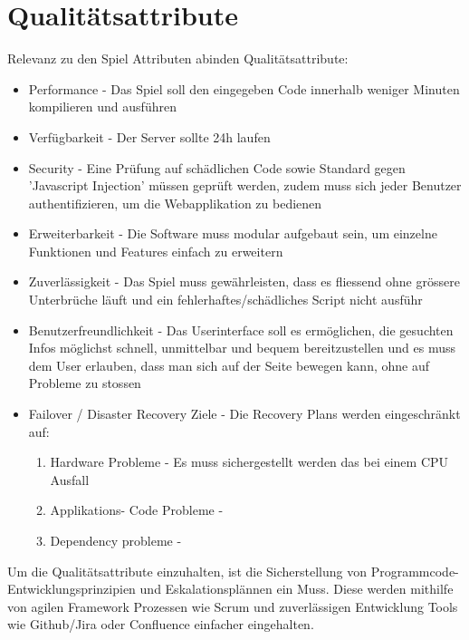 \documentclass[a4paper, 11pt]{scrartcl}
\let\oldsection\section
\renewcommand\section{\clearpage\oldsection}
\begin{document}
\section{Qualitätsattribute}

Relevanz zu den Spiel Attributen abinden
Qualitätsattribute:
\begin{itemize}

\item Performance - Das Spiel soll den eingegeben Code innerhalb weniger Minuten kompilieren und ausführen
\item Verfügbarkeit - Der Server sollte 24h laufen
\item Security - Eine Prüfung auf schädlichen Code sowie Standard gegen 'Javascript Injection' müssen geprüft werden, zudem muss sich jeder Benutzer authentifizieren, um die Webapplikation zu bedienen
\item Erweiterbarkeit - Die Software muss modular aufgebaut sein, um einzelne Funktionen und Features einfach zu erweitern
\item Zuverlässigkeit - Das Spiel muss gewährleisten, dass es fliessend ohne grössere Unterbrüche läuft und ein fehlerhaftes/schädliches Script nicht ausführ
\item Benutzerfreundlichkeit - Das Userinterface soll es ermöglichen, die gesuchten Infos möglichst schnell, unmittelbar und bequem bereitzustellen und es muss dem User erlauben, dass man sich auf der Seite bewegen kann, ohne auf Probleme zu stossen
\item Failover / Disaster Recovery Ziele - Die Recovery Plans werden eingeschränkt auf:
\begin{enumerate}
\item Hardware Probleme - Es muss sichergestellt werden das bei einem CPU Ausfall
\item Applikations- Code Probleme -
\item Dependency probleme -
\end{enumerate}

\end{itemize}

Um die Qualitätsattribute einzuhalten, ist die Sicherstellung von Programmcode-Entwicklungsprinzipien und Eskalationsplännen ein Muss. Diese werden mithilfe
von agilen Framework Prozessen wie Scrum und zuverlässigen Entwicklung Tools wie Github/Jira oder Confluence einfacher eingehalten.
\end{document}
